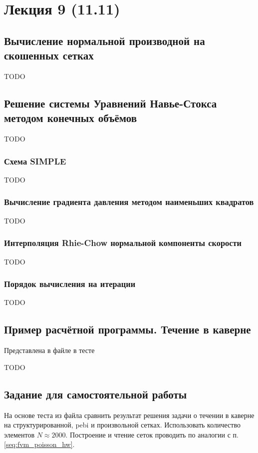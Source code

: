 \section{Лекция 9 (11.11)}

\subsection{Вычисление нормальной производной на скошенных сетках}
TODO

\subsection{Решение системы Уравнений Навье-Стокса методом конечных объёмов}
TODO

\subsubsection{Схема SIMPLE}
TODO

\subsubsection{Вычисление градиента давления методом наименьших квадратов}
TODO

\subsubsection{Интерполяция Rhie-Chow нормальной компоненты скорости} 
TODO

\subsubsection{Порядок вычисления на итерации}
TODO

\subsection{Пример расчётной программы. Течение в каверне}
Представлена в файле 
в тесте 

TODO

\subsection{Задание для самостоятельной работы}
На основе теста  из файла 
сравнить результат решения задачи
о течении в каверне на
структурированной, pebi и произвольной сетках.
Использовать количество элементов $N\approx2000$.
Построение и чтение сеток проводить по аналогии с п.\ref{seq:fvm_poisson_hw}.

